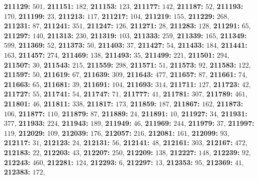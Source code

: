 \textsf{\bfseries 211129:} $501$, \textsf{\bfseries 211151:} $182$, \textsf{\bfseries 211153:} $123$, \textsf{\bfseries 211177:} $142$, \textsf{\bfseries 211187:} $52$, \textsf{\bfseries 211193:} $170$, \textsf{\bfseries 211199:} $23$, \textsf{\bfseries 211213:} $117$, \textsf{\bfseries 211217:} $104$, \textsf{\bfseries 211219:} $155$, \textsf{\bfseries 211229:} $268$, \textsf{\bfseries 211231:} $87$, \textsf{\bfseries 211241:} $351$, \textsf{\bfseries 211247:} $126$, \textsf{\bfseries 211271:} $28$, \textsf{\bfseries 211283:} $128$, \textsf{\bfseries 211291:} $65$, \textsf{\bfseries 211297:} $140$, \textsf{\bfseries 211313:} $230$, \textsf{\bfseries 211319:} $103$, \textsf{\bfseries 211333:} $259$, \textsf{\bfseries 211339:} $165$, \textsf{\bfseries 211349:} $599$, \textsf{\bfseries 211369:} $52$, \textsf{\bfseries 211373:} $50$, \textsf{\bfseries 211403:} $37$, \textsf{\bfseries 211427:} $54$, \textsf{\bfseries 211433:} $184$, \textsf{\bfseries 211441:} $163$, \textsf{\bfseries 211457:} $274$, \textsf{\bfseries 211469:} $138$, \textsf{\bfseries 211493:} $35$, \textsf{\bfseries 211499:} $221$, \textsf{\bfseries 211501:} $294$, \textsf{\bfseries 211507:} $30$, \textsf{\bfseries 211543:} $215$, \textsf{\bfseries 211559:} $298$, \textsf{\bfseries 211571:} $51$, \textsf{\bfseries 211573:} $92$, \textsf{\bfseries 211583:} $122$, \textsf{\bfseries 211597:} $50$, \textsf{\bfseries 211619:} $67$, \textsf{\bfseries 211639:} $309$, \textsf{\bfseries 211643:} $477$, \textsf{\bfseries 211657:} $87$, \textsf{\bfseries 211661:} $74$, \textsf{\bfseries 211663:} $65$, \textsf{\bfseries 211681:} $39$, \textsf{\bfseries 211691:} $104$, \textsf{\bfseries 211693:} $314$, \textsf{\bfseries 211711:} $127$, \textsf{\bfseries 211723:} $42$, \textsf{\bfseries 211727:} $55$, \textsf{\bfseries 211741:} $54$, \textsf{\bfseries 211747:} $71$, \textsf{\bfseries 211777:} $41$, \textsf{\bfseries 211781:} $307$, \textsf{\bfseries 211789:} $461$, \textsf{\bfseries 211801:} $46$, \textsf{\bfseries 211811:} $338$, \textsf{\bfseries 211817:} $173$, \textsf{\bfseries 211859:} $187$, \textsf{\bfseries 211867:} $162$, \textsf{\bfseries 211873:} $106$, \textsf{\bfseries 211877:} $110$, \textsf{\bfseries 211879:} $87$, \textsf{\bfseries 211889:} $24$, \textsf{\bfseries 211891:} $10$, \textsf{\bfseries 211927:} $34$, \textsf{\bfseries 211931:} $377$, \textsf{\bfseries 211933:} $224$, \textsf{\bfseries 211943:} $189$, \textsf{\bfseries 211949:} $46$, \textsf{\bfseries 211969:} $244$, \textsf{\bfseries 211979:} $37$, \textsf{\bfseries 211997:} $119$, \textsf{\bfseries 212029:} $109$, \textsf{\bfseries 212039:} $176$, \textsf{\bfseries 212057:} $216$, \textsf{\bfseries 212081:} $161$, \textsf{\bfseries 212099:} $93$, \textsf{\bfseries 212117:} $31$, \textsf{\bfseries 212123:} $24$, \textsf{\bfseries 212131:} $56$, \textsf{\bfseries 212141:} $48$, \textsf{\bfseries 212161:} $303$, \textsf{\bfseries 212167:} $472$, \textsf{\bfseries 212183:} $22$, \textsf{\bfseries 212203:} $43$, \textsf{\bfseries 212207:} $250$, \textsf{\bfseries 212209:} $138$, \textsf{\bfseries 212227:} $148$, \textsf{\bfseries 212239:} $92$, \textsf{\bfseries 212243:} $460$, \textsf{\bfseries 212281:} $124$, \textsf{\bfseries 212293:} $6$, \textsf{\bfseries 212297:} $13$, \textsf{\bfseries 212353:} $95$, \textsf{\bfseries 212369:} $41$, \textsf{\bfseries 212383:} $172$, 
